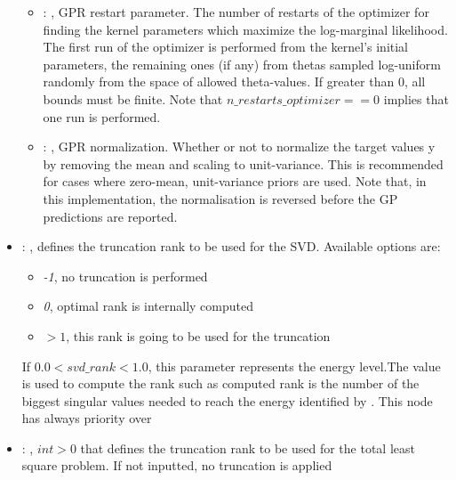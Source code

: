\begin{itemize}
\begin{itemize}
        \item {}: , 
          GPR restart parameter. The number of restarts of the optimizer for finding the
          kernel parameters which maximize the log-marginal likelihood. The first run of the
          optimizer                                                  is performed from the kernel’s
          initial parameters, the remaining ones (if any) from thetas
          sampled log-uniform randomly from the space of allowed theta-values. If greater than 0,
          all bounds must be finite. Note that $n\_restarts\_optimizer == 0$ implies that one run is
          performed.

        \item {}: , 
          GPR normalization. Whether or not to normalize the target values y by removing the mean
          and scaling                                                  to unit-variance. This is
          recommended for cases where zero-mean, unit-variance priors are used.
          Note that, in this implementation, the normalisation is reversed before the GP predictions
          are reported.
      \end{itemize}

    \item {}: , 
      defines the truncation rank to be used for the SVD.
      Available options are:                                                  \begin{itemize}
      \item \textit{-1}, no truncation is performed
      \item \textit{0}, optimal rank is internally computed
      \item \textit{$>1$}, this rank is going to be used for the truncation
      \end{itemize}                                                  If $0.0 < svd\_rank < 1.0$, this
      parameter represents the energy level.The value is used to compute the rank such
      as computed rank is the number of the biggest singular values needed to reach the energy
      identified by                                                    . This
      node has always priority over  

    \item {}: , 
      $int > 0$ that defines the truncation rank to be used for the total
      least square problem. If not inputted, no truncation is applied


\end{itemize}
